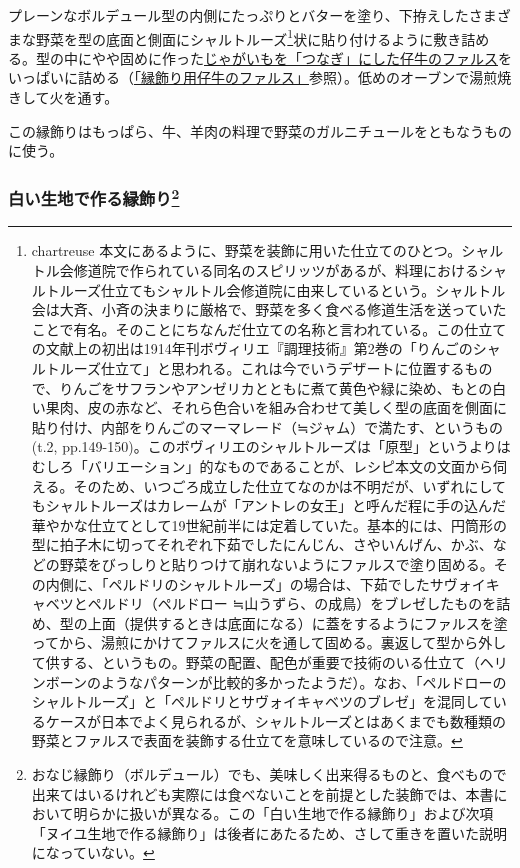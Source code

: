 \begin{recette}
プレーンなボルデュール型の内側にたっぷりとバターを塗り、下拵えしたさまざまな野菜を型の底面と側面にシャルトルーズ\footnote{chartreuse
  本文にあるように、野菜を装飾に用いた仕立てのひとつ。シャルトル会修道院で作られている同名のスピリッツがあるが、料理におけるシャルトルーズ仕立てもシャルトル会修道院に由来しているという。シャルトル会は大斉、小斉の決まりに厳格で、野菜を多く食べる修道生活を送っていたことで有名。そのことにちなんだ仕立ての名称と言われている。この仕立ての文献上の初出は1914年刊ボヴィリエ『調理技術』第2巻の「りんごのシャルトルーズ仕立て」と思われる。これは今でいうデザートに位置するもので、りんごをサフランやアンゼリカとともに煮て黄色や緑に染め、もとの白い果肉、皮の赤など、それら色合いを組み合わせて美しく型の底面を側面に貼り付け、内部をりんごのマーマレード（≒ジャム）で満たす、というもの(t.2,
  pp.149-150)。このボヴィリエのシャルトルーズは「原型」というよりはむしろ「バリエーション」的なものであることが、レシピ本文の文面から伺える。そのため、いつごろ成立した仕立てなのかは不明だが、いずれにしてもシャルトルーズはカレームが「アントレの女王」と呼んだ程に手の込んだ華やかな仕立てとして19世紀前半には定着していた。基本的には、円筒形の型に拍子木に切ってそれぞれ下茹でしたにんじん、さやいんげん、かぶ、などの野菜をびっしりと貼りつけて崩れないようにファルスで塗り固める。その内側に、「ペルドリのシャルトルーズ」の場合は、下茹でしたサヴォイキャベツとペルドリ（ペルドロー
  ≒山うずら、の成鳥）をブレゼしたものを詰め、型の上面（提供するときは底面になる）に蓋をするようにファルスを塗ってから、湯煎にかけてファルスに火を通して固める。裏返して型から外して供する、というもの。野菜の配置、配色が重要で技術のいる仕立て（ヘリンボーンのようなパターンが比較的多かったようだ）。なお、「ペルドローのシャルトルーズ」と「ペルドリとサヴォイキャベツのブレゼ」を混同しているケースが日本でよく見られるが、シャルトルーズとはあくまでも数種類の野菜とファルスで表面を装飾する仕立てを意味しているので注意。}状に貼り付けるように敷き詰める。型の中にやや固めに作った\protect\hyperlink{farce-de-veau-pour-bordures}{じゃがいもを「つなぎ」にした仔牛のファルス}をいっぱいに詰める（\protect\hyperlink{farce-de-veau-pour-bordures}{「縁飾り用仔牛のファルス」}参照）。低めのオーブンで湯煎焼きして火を通す。

この縁飾りはもっぱら、牛、羊肉の料理で野菜のガルニチュールをともなうものに使う。

\hypertarget{bordures-en-pate-blanche}{%
\subsubsection[白い生地で作る縁飾り]{\texorpdfstring{白い生地で作る縁飾り\footnote{おなじ縁飾り（ボルデュール）でも、美味しく出来得るものと、食べもので出来てはいるけれども実際には食べないことを前提とした装飾では、本書において明らかに扱いが異なる。この「白い生地で作る縁飾り」および次項「ヌイユ生地で作る縁飾り」は後者にあたるため、さして重きを置いた説明になっていない。}}{白い生地で作る縁飾り}}\label{bordures-en-pate-blanche}}


\end{recette}
